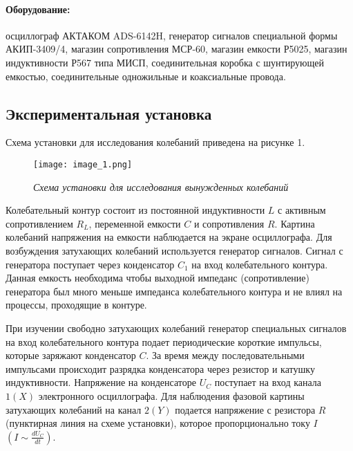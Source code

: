 \documentclass[a4paper,12pt]{article} %
\begin{document}
\paragraph{Оборудование:} осциллограф АКТАКОМ ADS-6142H, генератор сигналов специальной формы АКИП-3409/4, магазин сопротивления МСР-60, магазин емкости Р5025, магазин индуктивности Р567 типа МИСП, соединительная коробка с шунтирующей емкостью, соединительные одножильные и коаксиальные провода.

\subsection{Экспериментальная установка}

Схема установки для исследования колебаний приведена на рисунке 1.\par\par

\begin{figure}[h]
\begin{center}
		\texttt{[image: image\_1.png]}
\end{center}
	\caption{\textit{Схема установки для исследования вынужденных колебаний}}
	\label{img1}
\end{figure}

Колебательный контур состоит из постоянной индуктивности $L$ с активным сопротивлением $R_L$, переменной емкости $C$ и сопротивления $R$. Картина колебаний напряжения на емкости наблюдается на экране осциллографа. Для возбуждения затухающих колебаний используется генератор сигналов. Сигнал с генератора поступает через конденсатор $C_1$ на вход колебательного контура. Данная емкость необходима чтобы выходной импеданс (сопротивление) генератора был много меньше импеданса колебательного контура и не влиял на процессы, проходящие в контуре.\par

При изучении свободно затухающих колебаний генератор специальных сигналов на вход колебательного контура подает периодические короткие импульсы, которые заряжают конденсатор $C$. За время между последовательными импульсами происходит разрядка конденсатора через резистор и катушку индуктивности. Напряжение на конденсаторе $U_C$ поступает на вход канала $1(X)$ электронного осциллографа. Для наблюдения фазовой картины затухающих колебаний на канал $2(Y)$ подается напряжение с резистора $R$ (пунктирная линия на схеме установки), которое пропорционально току $I$ $(I \sim \frac{dU_C}{dt})$.\par
\end{document}
